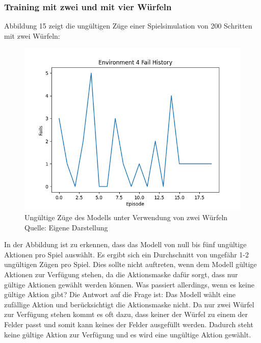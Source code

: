 \subsubsection{Training mit zwei und mit vier Würfeln}
Abbildung 15 zeigt die ungültigen Züge einer Spielsimulation von 200 Schritten mit zwei Würfeln:
\nopagebreak
\begin{figure}[H]
	\includegraphics[width=1\textwidth]{Bilder/failswithtwodice} 
	\caption[Ungültige Züge des Modells unter Verwendung von zwei Würfeln]{Ungültige Züge des Modells unter Verwendung von zwei Würfeln\\ Quelle: Eigene Darstellung}
\end{figure}

In der Abbildung ist zu erkennen, dass das Modell von null bis fünf ungültige Aktionen pro Spiel auswählt. Es ergibt sich ein Durchschnitt von ungefähr 1-2 ungültigen Zügen pro Spiel. Dies sollte nicht auftreten, wenn dem Modell gültige Aktionen zur Verfügung stehen, da die Aktionsmaske dafür sorgt, dass nur gültige Aktionen gewählt werden können. Was passiert allerdings, wenn es keine gültige Aktion gibt? Die Antwort auf die Frage ist: Das Modell wählt eine zufällige Aktion und berücksichtigt die Aktionsmaske nicht. Da nur zwei Würfel zur Verfügung stehen kommt es oft dazu, dass keiner der Würfel zu einem der Felder passt und somit kann keines der Felder ausgefüllt werden. Dadurch steht keine gültige Aktion zur Verfügung und es wird eine ungültige Aktion gewählt.\\

